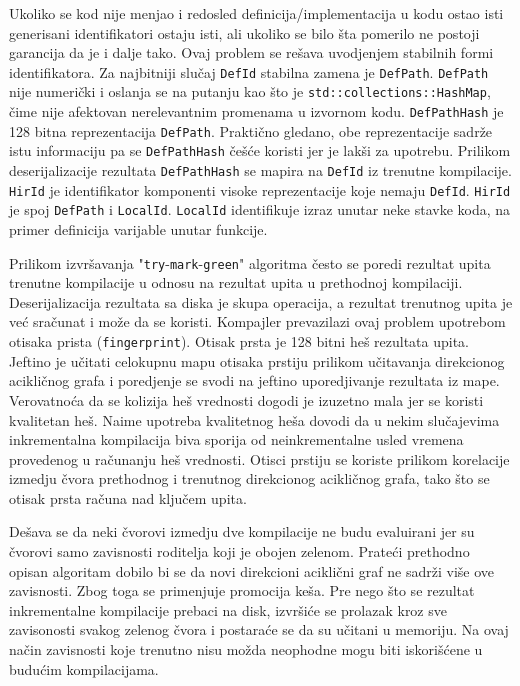 Ukoliko se kod nije menjao i redosled definicija/implementacija u kodu ostao isti generisani 
identifikatori ostaju isti, ali ukoliko se bilo šta pomerilo ne postoji garancija da je i dalje tako. Ovaj problem se rešava 
uvodjenjem stabilnih formi identifikatora. Za najbitniji slučaj \verb|DefId| stabilna zamena je \verb|DefPath|. \verb|DefPath| nije numerički 
i oslanja se na putanju kao što je \verb|std::collections::HashMap|, čime nije afektovan nerelevantnim promenama u izvornom kodu. 
\verb|DefPathHash| je 128 bitna reprezentacija \verb|DefPath|. Praktično gledano, obe reprezentacije sadrže istu informaciju pa se 
\verb|DefPathHash| češće koristi jer je lakši za upotrebu. Prilikom deserijalizacije rezultata \verb|DefPathHash| se mapira na 
\verb|DefId| iz trenutne kompilacije. \verb|HirId| je identifikator komponenti visoke reprezentacije koje nemaju \verb|DefId|. 
\verb|HirId| je spoj \verb|DefPath| i \verb|LocalId|. \verb|LocalId| identifikuje izraz unutar neke stavke koda, na primer 
definicija varijable unutar funkcije.

Prilikom izvršavanja "\verb|try|-\verb|mark|-\verb|green|" algoritma često se poredi rezultat upita trenutne kompilacije u odnosu 
na rezultat upita u prethodnoj kompilaciji. Deserijalizacija rezultata sa diska je skupa operacija, a rezultat trenutnog upita je 
već sračunat i može da se koristi. Kompajler prevazilazi ovaj problem upotrebom otisaka prista (\verb|fingerprint|). Otisak prsta 
je 128 bitni heš rezultata upita. Jeftino je učitati celokupnu mapu otisaka prstiju prilikom učitavanja direkcionog acikličnog grafa 
i poredjenje se svodi na jeftino uporedjivanje rezultata iz mape. Verovatnoća da se kolizija heš vrednosti dogodi je izuzetno mala 
jer se koristi kvalitetan heš. Naime upotreba kvalitetnog heša dovodi da u nekim slučajevima inkrementalna kompilacija biva 
sporija od neinkrementalne usled vremena provedenog u računanju heš vrednosti. Otisci prstiju se koriste prilikom korelacije 
izmedju čvora prethodnog i trenutnog direkcionog acikličnog grafa, tako što se otisak prsta računa nad ključem upita.

Dešava se da neki čvorovi izmedju dve kompilacije ne budu evaluirani jer su čvorovi samo zavisnosti roditelja koji je obojen 
zelenom. Prateći prethodno opisan algoritam dobilo bi se da novi direkcioni aciklični graf ne sadrži više ove zavisnosti. Zbog 
toga se primenjuje promocija keša. Pre nego što se rezultat inkrementalne kompilacije prebaci na disk, izvršiće se prolazak 
kroz sve zavisonosti svakog zelenog čvora i postaraće se da su učitani u memoriju. Na ovaj način zavisnosti koje trenutno 
nisu možda neophodne mogu biti iskorišćene u budućim kompilacijama. 

